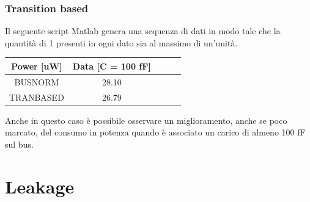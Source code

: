 \documentclass[11pt,  english, makeidx, a4paper, titlepage, oneside]{book}
\newenvironment{listato}{\footnotesize} {\normalsize }
\begin{document}
\subsection{Transition based}
Il seguente script Matlab genera una sequenza di dati in modo tale che la quantità di 1 presenti in ogni dato sia al massimo di un'unità.
\begin{center}
\begin{listato}
	\centerline{}
\end{listato}
\end{center}
\begin{center}
	\begin{tabular}{|c|c|c|c|c|}
	\hline
	Power [uW] & Data [C = 100 fF]\\
	\hline
	BUSNORM & 28.10\\
	 \hline
	TRANBASED & 26.79\\
	\hline
	\end{tabular}	
\end{center}
\vspace{0.3cm}
Anche in questo caso è possibile osservare un miglioramento, anche se poco marcato, del consumo in potenza quando è associato un carico di almeno 100 fF sul bus.
\chapter{Leakage}
\end{document}
